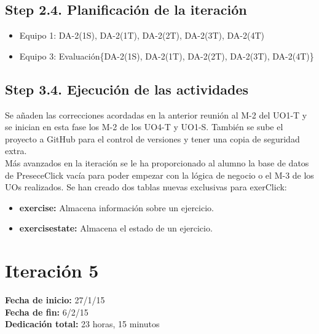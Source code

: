 \subsection{Step 2.4. Planificación de la iteración}
\label{it4:2.4}

\begin{itemize}
\item Equipo 1: DA-2(1S), DA-2(1T), DA-2(2T), DA-2(3T), DA-2(4T)
\item Equipo 3: Evaluación\{DA-2(1S), DA-2(1T), DA-2(2T), DA-2(3T), DA-2(4T)\}
\end{itemize}

\subsection{Step 3.4. Ejecución de las actividades}
\label{it4:3.4}

Se añaden las correcciones acordadas en la anterior reunión al M-2 del UO1-T y se inician en esta fase los M-2 de los UO4-T y UO1-S. También se sube el proyecto a GitHub para el control de versiones y tener una copia de seguridad extra.\\

Más avanzados en la iteración se le ha proporcionado al alumno la base de datos de PreseceClick vacía para poder empezar con la lógica de negocio o el M-3 de los UOs realizados. Se han creado dos tablas nuevas exclusivas para exerClick:

\begin{itemize}
\item \textbf{exercise:} Almacena información sobre un ejercicio.
\item \textbf{exercisestate:} Almacena el estado de un ejercicio.
\end{itemize}


\section{Iteración 5}
\label{it5}

\begin{flushleft}
\textbf{Fecha de inicio:} 27/1/15\\
\textbf{Fecha de fin:} 6/2/15\\
\textbf{Dedicación total:} 23 horas, 15 minutos\\
\end{flushleft}

